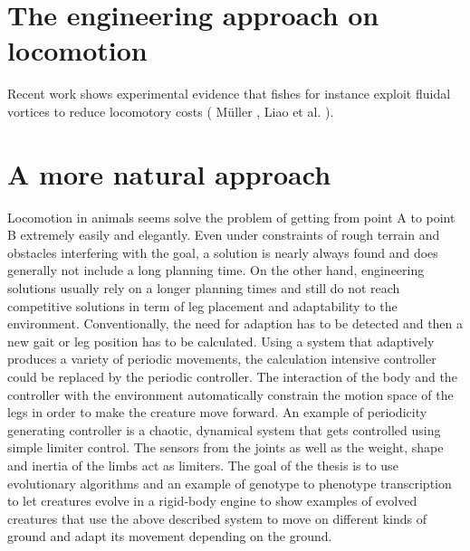 \documentclass[main]{subfiles}
\begin{document}

\section{The engineering approach on locomotion}


Recent work shows experimental evidence that fishes for instance exploit fluidal vortices to reduce locomotory costs ( Müller \cite{bib:Muller2003}, Liao et al. \cite{bib:Liao2003a,bib:Liao2003b}).


\section{A more natural approach}

Locomotion in animals seems solve the problem of getting from point A to point B extremely easily and elegantly. Even under constraints of rough terrain and obstacles interfering with the goal, a solution is nearly always found and does generally not include a long planning time. On the other hand, engineering solutions usually rely on a longer planning times and still do not reach competitive solutions in term of leg placement and adaptability to the environment. Conventionally, the need for adaption has to be detected and then a new gait or leg position has to be calculated. Using a system that adaptively produces a variety of periodic movements, the calculation intensive controller could be replaced by the periodic controller. The interaction of the body and the controller with the environment automatically constrain the motion space of the legs in order to make the creature move forward. An example of periodicity generating controller is a chaotic, dynamical system that gets controlled using simple limiter control. The sensors from the joints as well as the weight, shape and inertia of the limbs act as limiters. The goal of the thesis is to use evolutionary algorithms and an example of genotype to phenotype transcription to let creatures evolve in a rigid-body engine to show examples of evolved creatures that use the above described system to move on different kinds of ground and adapt its movement depending on the ground.

\end{document}
